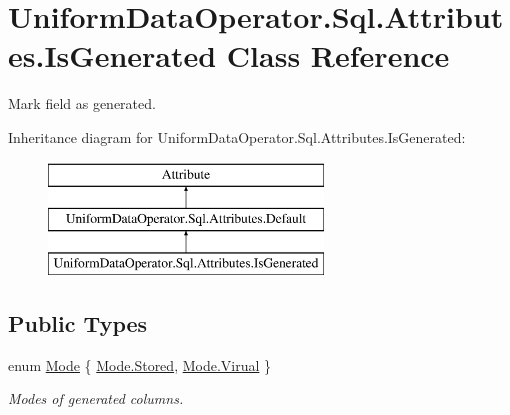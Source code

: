 \hypertarget{class_uniform_data_operator_1_1_sql_1_1_attributes_1_1_is_generated}{}\section{Uniform\+Data\+Operator.\+Sql.\+Attributes.\+Is\+Generated Class Reference}
\label{class_uniform_data_operator_1_1_sql_1_1_attributes_1_1_is_generated}


Mark field as generated.  


Inheritance diagram for Uniform\+Data\+Operator.\+Sql.\+Attributes.\+Is\+Generated\+:\begin{figure}[H]
\begin{center}
\leavevmode
\includegraphics[height=3.000000cm]{d7/daf/class_uniform_data_operator_1_1_sql_1_1_attributes_1_1_is_generated}
\end{center}
\end{figure}
\subsection*{Public Types}
\begin{DoxyCompactItemize}
\item 
enum \mbox{\hyperlink{class_uniform_data_operator_1_1_sql_1_1_attributes_1_1_is_generated_aa8286a355a1ac86ccd56cf5b44f5ed59}{Mode}} \{ \mbox{\hyperlink{class_uniform_data_operator_1_1_sql_1_1_attributes_1_1_is_generated_aa8286a355a1ac86ccd56cf5b44f5ed59a7bf2d26eab899c413218b729d4d914b7}{Mode.\+Stored}}, 
\mbox{\hyperlink{class_uniform_data_operator_1_1_sql_1_1_attributes_1_1_is_generated_aa8286a355a1ac86ccd56cf5b44f5ed59aa6d194ab7efe0417c28a02b8a8997bd0}{Mode.\+Virual}}
 \}
\begin{DoxyCompactList}\small\item\em Modes of generated columns. \end{DoxyCompactList}\end{DoxyCompactItemize}

